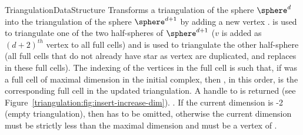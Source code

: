 \begin{ccRefConcept}{TriangulationDataStructure}
{Transforms a triangulation of  the sphere $\sphere^d$ into the
triangulation of the sphere $\sphere^{d+1}$ by adding a new vertex
.
 is used to triangulate one of the two half-spheres of
$\sphere^{d+1}$ ($v$ is added as $(d+2)^{th}$ vertex to all
full cells)
and  is used to triangulate the other half-sphere
(all full cells that do not already have star as vertex are duplicated,
and  replaces  in these full cells).
The indexing of the vertices in the
full cell is such that, if  was a full cell of maximal dimension in the
initial complex, then , in this order, is the corresponding full cell
in the updated triangulation. A handle to  is returned
(see Figure~\ref{triangulation:fig:insert-increase-dim}).
\ccPrecond\ccVar.
If the current dimension is -2 (empty triangulation), then 
has to be omitted, otherwise
the current dimension must be strictly less than the maximal dimension
and  must be a vertex of \ccVar.}


\end{ccRefConcept}
